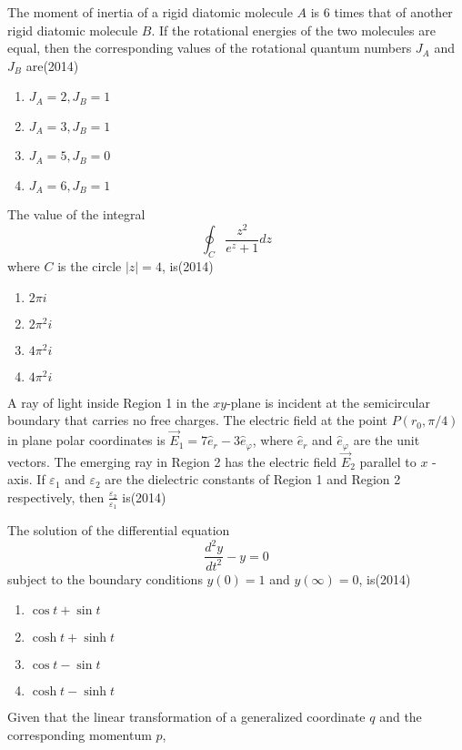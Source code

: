\item The moment of inertia of a rigid diatomic molecule $A$ is 6 times that of another rigid diatomic molecule $B$. If the rotational energies of the two molecules are equal, then the corresponding values of the rotational quantum numbers $J_{{A}}$ and $J_{{B}}$ are\hfill{(2014)}
   \begin{multicols}{4}
			\begin{enumerate}
   \item $J_{{A}}=2, J_{{B}}=1$
\item  $J_{{A}}=3, J_{{B}}=1$
\item$J_{{A}}=5, J_{{B}}=0$
\item  $J_{A}=6, J_{B}=1$
\end{enumerate}
		\end{multicols}
  \item The value of the integral
$$
\oint_{C} \frac{z^{2}}{e^{z}+1} d z
$$
where $C$ is the circle $|z|=4$, is\hfill{(2014)}
\begin{enumerate}
    \item $2 \pi i$
    \item $2 \pi^{2} i$
    \item $4 \pi^{2} i$
    \item $4 \pi^{2} i$
\end{enumerate}
  \item   A ray of light inside Region 1 in the $x y$-plane is incident at the semicircular boundary that carries no free charges. The electric field at the point $P\left(r_{0}, \pi / 4\right)$ in plane polar coordinates is $\vec{E}_{1}=7 \hat{e}_{r}-3 \hat{e}_{\varphi}$, where $\hat{e}_{r}$ and $\hat{e}_{\varphi}$ are the unit vectors. The emerging ray in Region 2 has the electric field $\vec{E}_{2}$ parallel to $x$ - axis. If $\varepsilon_{1}$ and $\varepsilon_{2}$ are the dielectric constants of Region 1 and Region 2 respectively, then $\frac{\varepsilon_{2}}{\varepsilon_{1}}$ is\hfill{(2014)}
  
  
  
\item     The solution of the differential equation
$$
\frac{d^{2} y}{d t^{2}}-y=0
$$
subject to the boundary conditions $y(0)=1$ and $y(\infty)=0$, is\hfill{(2014)}
\begin{multicols}{4}
			\begin{enumerate}

\item $\cos t+\sin t$
\item $\cosh t+\sinh t$
\item $\cos t-\sin t$
\item  $\cosh t-\sinh t$
   \end{enumerate}
		\end{multicols}
  \item Given that the linear transformation of a generalized coordinate $q$ and the corresponding momentum $p$,

